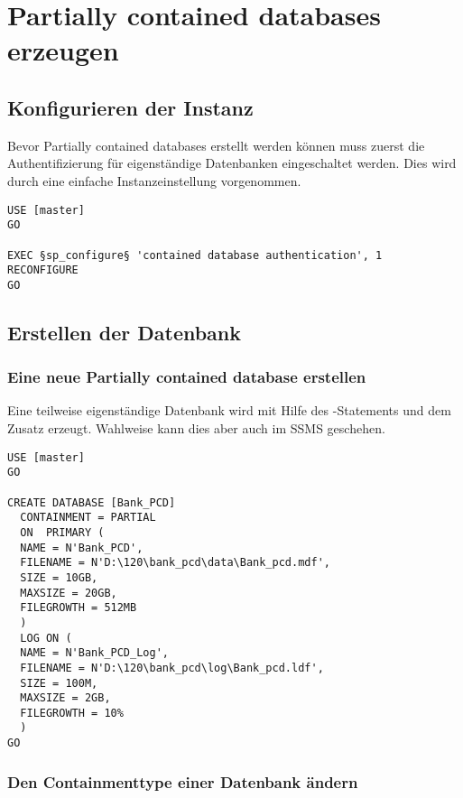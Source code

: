       \section{Partially contained databases erzeugen}
        \subsection{Konfigurieren der Instanz}
          Bevor Partially contained databases erstellt werden können muss zuerst
          die Authentifizierung für eigenständige Datenbanken eingeschaltet
          werden. Dies wird durch eine einfache Instanzeinstellung vorgenommen.
          \begin{lstlisting}[language=ms_sql,caption={Eigen\-stän\-dige Daten\-banken
          aktivieren},label=sql20_01]
USE [master]
GO

EXEC §sp_configure§ 'contained database authentication', 1
RECONFIGURE
GO          
          \end{lstlisting}
        \subsection{Erstellen der Datenbank}
          \subsubsection{Eine neue Partially contained database erstellen}
            Eine teilweise eigenständige Datenbank wird mit Hilfe des
            -Statements und dem Zusatz
             erzeugt. Wahlweise kann dies
            aber auch im SSMS geschehen.
            \begin{lstlisting}[language=ms_sql,caption={Erstellen einer teilweise eigen\-stän\-digen Daten\-bank},label=sql20_02]
USE [master]
GO

CREATE DATABASE [Bank_PCD]
  CONTAINMENT = PARTIAL
  ON  PRIMARY (
  NAME = N'Bank_PCD',
  FILENAME = N'D:\120\bank_pcd\data\Bank_pcd.mdf',
  SIZE = 10GB,
  MAXSIZE = 20GB,
  FILEGROWTH = 512MB
  )
  LOG ON (
  NAME = N'Bank_PCD_Log',
  FILENAME = N'D:\120\bank_pcd\log\Bank_pcd.ldf',
  SIZE = 100M,
  MAXSIZE = 2GB,
  FILEGROWTH = 10%
  )
GO
            \end{lstlisting}
          \subsubsection{Den Containmenttype einer Datenbank ändern}
          
